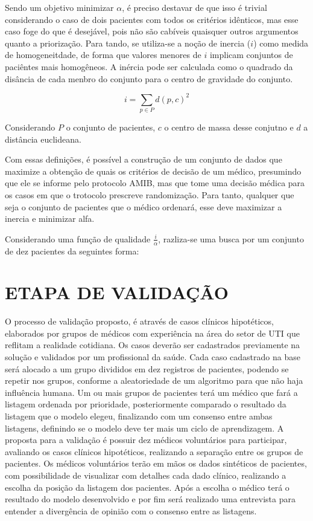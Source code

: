 \documentclass[12pt]{article}
\begin{document}
Sendo um objetivo minimizar $\alpha$, é preciso destavar de que isso é trivial considerando o caso de dois pacientes com todos os critérios idênticos, mas esse caso foge do que é desejável, pois não são cabíveis quaisquer outros argumentos quanto a priorização.
Para tando, se utiliza-se a noção de inercia ($i$) como medida de homogeneitdade, de forma que valores menores de $i$ implicam conjuntos de paciêntes mais homogêneos.
A inércia pode ser calculada como o quadrado da disância de cada menbro do conjunto para o centro de gravidade do conjunto.

\[
i = \sum_{p \in P}d(p, c)^2
\] 

Considerando $P$ o conjunto de pacientes, $c$ o centro de massa desse conjutno e $d$ a distância euclideana.

Com essas definições, é possível a construção de um conjunto de dados que maximize a obtenção de quais os critérios de decisão de um médico, presumindo que ele se informe pelo protocolo AMIB, mas que tome uma decisão médica para os casos em que o trotocolo prescreve randomização.
Para tanto, qualquer que seja o conjunto de pacientes que o médico ordenará, esse deve maximizar a inercia e minimizar alfa.

Considerando uma função de qualidade $\frac{i}{\alpha}$, razliza-se uma busca por um conjunto de dez pacientes da seguintes forma:

\section{ETAPA DE VALIDAÇÃO}
O processo de validação proposto, é através de casos clínicos hipotéticos, elaborados por grupos de médicos com experiência na área do setor de UTI que reflitam a realidade cotidiana. Os casos deverão ser cadastrados previamente na solução e validados por um profissional da saúde. Cada caso cadastrado na base será alocado a um grupo divididos em dez registros de pacientes, podendo se repetir nos grupos, conforme a aleatoriedade de um algoritmo para que não haja influência humana.
Um ou mais grupos de pacientes  terá  um  médico  que  fará  a  listagem  ordenada por prioridade, posteriormente comparado o resultado da listagem que o modelo elegeu, finalizando com um consenso entre ambas listagens, definindo se o modelo deve ter mais um ciclo de aprendizagem.
A proposta para a validação é possuir dez médicos voluntários para participar, avaliando os casos clínicos hipotéticos, realizando a separação entre os grupos de pacientes.
Os médicos voluntários terão em mãos os dados sintéticos de pacientes, com possibilidade de visualizar com detalhes cada dado clínico, realizando a escolha da posição da listagem dos pacientes. Após a escolha o médico terá o resultado do modelo desenvolvido e por fim será realizado uma entrevista para entender a divergência de opinião com o consenso entre as listagens.
\end{document}
